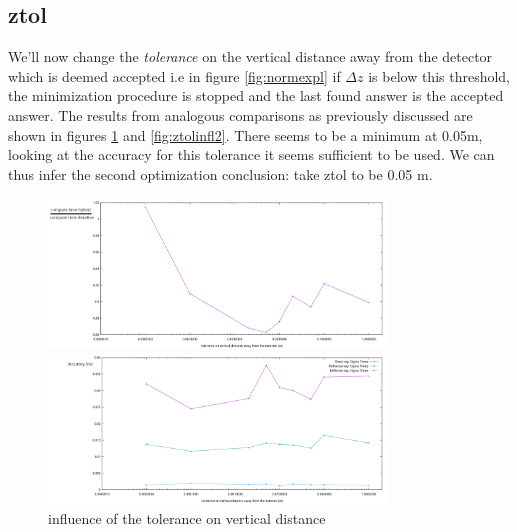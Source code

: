 \subsection{ztol}
We'll now change the \textit{tolerance} on the vertical distance away from the
detector which is deemed accepted i.e in figure \ref{fig:normexpl} if $\Delta
z$ is below this threshold, the minimization procedure is stopped and the last
found answer is the accepted answer.  The results from analogous comparisons as
previously discussed are shown in figures \ref{fig:ztolinfl} and
\ref{fig:ztolinfl2}.  There seems to be a minimum at 0.05m, looking at the
accuracy for this tolerance it seems sufficient to be used.  We can thus infer
the second optimization conclusion: take ztol to be 0.05 m.
\begin{figure}
	\centering
	\begin{minipage}{\textwidth}
		\includegraphics[width=0.8\textwidth]{figures/ZtolVsTime2.pdf}
	\end{minipage}
	\begin{minipage}{\textwidth}
		\includegraphics[width=0.8\textwidth]{figures/ZtolVsSigmaTime.pdf}
	\end{minipage}
\caption{influence of the tolerance on vertical distance}
\label{fig:ztolinfl}
\end{figure}

